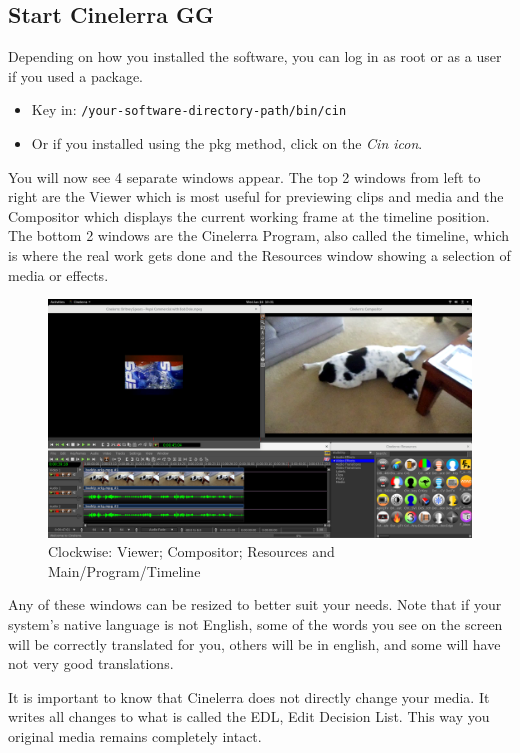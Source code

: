 \subsection{Start Cinelerra GG}%
\label{sub:start_cinelerra_gg}

Depending on how you installed the software, you can log in as root or as a user if you used a package.

\begin{itemize}[noitemsep]
	\item Key in:  \texttt{/your-software-directory-path/bin/cin}
	\item Or if you installed using the pkg method, click on the \textit{Cin icon}.
\end{itemize}

You will now see 4 separate windows appear.  The top 2 windows from left to right are the Viewer which is most useful for previewing clips and media and the Compositor which displays the current working frame at the timeline position.  The bottom 2 windows are the Cinelerra Program, also called the timeline, which is where the real work gets done and the Resources window showing a selection of media or effects.

\begin{figure}[htpb]
	\centering
	\includegraphics[width=1.0\linewidth]{images/4windows.png}
	\caption{Clockwise: Viewer; Compositor; Resources and Main/Program/Timeline}	
\end{figure}

Any of these windows can be resized to better suit your needs.  Note that if your system’s native language is not English, some of the words you see on the screen will be correctly translated for you, others will be in english, and some will have not very good translations.

It is important to know that Cinelerra does not directly change your media.  It writes all changes to what is called the EDL, Edit Decision List.  This way you original media remains completely intact.

